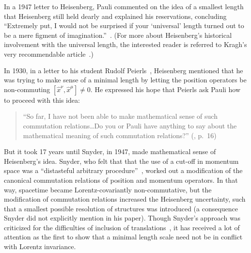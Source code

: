 \documentclass{article}
\begin{document}
In a 1947 letter to Heisenberg, Pauli commented on
the idea of a smallest length that Heisenberg still held dearly and explained his reservations, concluding
``Extremely put, I would not be surprised if your `universal' length turned out to be a mere
figment of imagination.''~\cite{Pauliletter}. (For more about Heisenberg's historical 
involvement with the universal length, the interested reader is referred to Kragh's very recommendable
article~\cite{Kragh}.)

In 1930, in a letter to his student Rudolf Peierls~\cite{Peierls},
Heisenberg mentioned that he was trying to make sense of a minimal
length by letting the position operators be non-commuting $[\hat
  x^\nu, \hat x^\mu] \neq 0$. He expressed his hope that Peierls ask
Pauli how to proceed with this idea: 
%
\begin{quote}
``So far, I have not been able to make mathematical sense of such
  commutation relations\ldots Do you or Pauli have anything to say
  about the mathematical meaning of such commutation relations?''%
  (\cite{Peierls}, p.~16)
\end{quote} 

But it took 17 years until Snyder, in 1947, made mathematical sense of Heisenberg's idea.%
Snyder, who felt that that the use of a cut-off  in momentum space was a ``distasteful arbitrary procedure''~\cite{Snyder}, worked out a modification of the canonical commutation relations of position and momentum operators. 
In that way, spacetime became
Lorentz-covariantly non-commutative, but the modification of commutation relations increased the Heisenberg uncertainty,
such that a smallest possible resolution of structures was introduced (a consequence Snyder did not explicitly mention in his paper). Though Snyder's approach was criticized for the difficulties of inclusion of translations~\cite{Yang}, it has received
a lot of attention as the first to show that a minimal length scale need not
be in conflict with Lorentz invariance. 
\end{document}
